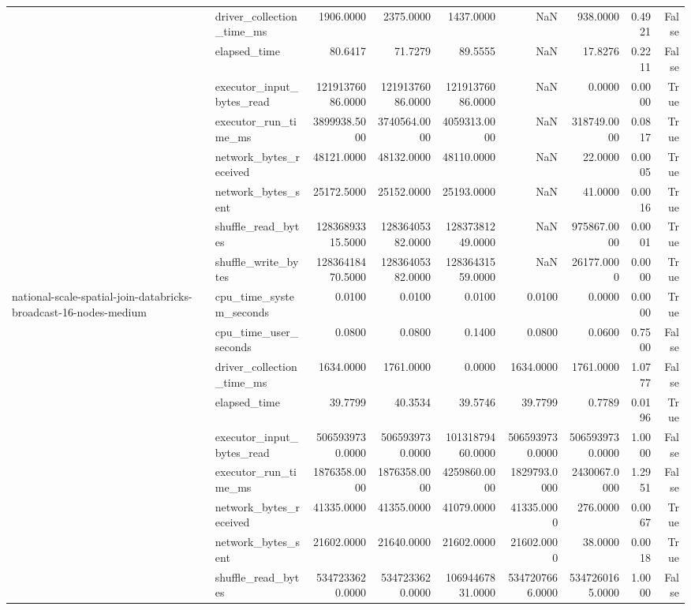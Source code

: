 \begin{tabular}{llrrrrrrr}
 & driver\_collection\_time\_ms & 1906.0000 & 2375.0000 & 1437.0000 & NaN & 938.0000 & 0.4921 & False \\
 & elapsed\_time & 80.6417 & 71.7279 & 89.5555 & NaN & 17.8276 & 0.2211 & False \\
 & executor\_input\_bytes\_read & 12191376086.0000 & 12191376086.0000 & 12191376086.0000 & NaN & 0.0000 & 0.0000 & True \\
 & executor\_run\_time\_ms & 3899938.5000 & 3740564.0000 & 4059313.0000 & NaN & 318749.0000 & 0.0817 & True \\
 & network\_bytes\_received & 48121.0000 & 48132.0000 & 48110.0000 & NaN & 22.0000 & 0.0005 & True \\
 & network\_bytes\_sent & 25172.5000 & 25152.0000 & 25193.0000 & NaN & 41.0000 & 0.0016 & True \\
 & shuffle\_read\_bytes & 12836893315.5000 & 12836405382.0000 & 12837381249.0000 & NaN & 975867.0000 & 0.0001 & True \\
 & shuffle\_write\_bytes & 12836418470.5000 & 12836405382.0000 & 12836431559.0000 & NaN & 26177.0000 & 0.0000 & True \\
\cline{1-9}
\multirow[t]{10}{*}{national-scale-spatial-join-databricks-broadcast-16-nodes-medium} & cpu\_time\_system\_seconds & 0.0100 & 0.0100 & 0.0100 & 0.0100 & 0.0000 & 0.0000 & True \\
 & cpu\_time\_user\_seconds & 0.0800 & 0.0800 & 0.1400 & 0.0800 & 0.0600 & 0.7500 & False \\
 & driver\_collection\_time\_ms & 1634.0000 & 1761.0000 & 0.0000 & 1634.0000 & 1761.0000 & 1.0777 & False \\
 & elapsed\_time & 39.7799 & 40.3534 & 39.5746 & 39.7799 & 0.7789 & 0.0196 & True \\
 & executor\_input\_bytes\_read & 5065939730.0000 & 5065939730.0000 & 10131879460.0000 & 5065939730.0000 & 5065939730.0000 & 1.0000 & False \\
 & executor\_run\_time\_ms & 1876358.0000 & 1876358.0000 & 4259860.0000 & 1829793.0000 & 2430067.0000 & 1.2951 & False \\
 & network\_bytes\_received & 41335.0000 & 41355.0000 & 41079.0000 & 41335.0000 & 276.0000 & 0.0067 & True \\
 & network\_bytes\_sent & 21602.0000 & 21640.0000 & 21602.0000 & 21602.0000 & 38.0000 & 0.0018 & True \\
 & shuffle\_read\_bytes & 5347233620.0000 & 5347233620.0000 & 10694467831.0000 & 5347207666.0000 & 5347260165.0000 & 1.0000 & False \\

\end{tabular}
